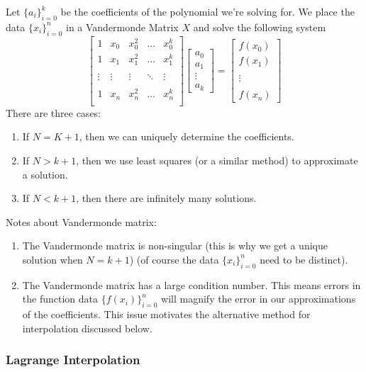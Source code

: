 \documentclass[12pt]{article}
\theoremstyle{definition}
\theoremstyle{definition}
\begin{document}
Let $\{a_i\}_{i=0}^k$ be the coefficients of the polynomial we're solving for. We place the data $\{x_i\}_{i=0}^n$ in a Vandermonde Matrix $X$ and solve the following system
\begin{equation}
	\begin{bmatrix}
	1 & x_0 & x_0^2 & \ldots & x_0^k \\
	1 & x_1 & x_1^2 & \ldots & x_1^k \\ \\
	\vdots & \vdots & \vdots & \ddots & \vdots \\ \\
	1 & x_n & x_n^2 & \ldots & x_n^k \\
	\end{bmatrix}
	\begin{bmatrix}
	a_0 \\ a_1 \\ \vdots \\ a_k
	\end{bmatrix}
	=
	\begin{bmatrix}
	f(x_0) \\ f(x_1) \\ \\ \vdots \\ \\ f(x_n)
	\end{bmatrix}
\end{equation}
There are three cases:
\begin{enumerate}
	\item If $N=K+1$, then we can uniquely determine the coefficients.
	\item If $N > k+1$, then we use least squares (or a similar method) to approximate a solution.
	\item If $N < k+1$, then there are infinitely many solutions. 
\end{enumerate}
Notes about Vandermonde matrix:
\begin{enumerate}
	\item The Vandermonde matrix is non-singular (this is why we get a unique solution when $N=k+1$) (of course the data $\{x_i\}_{i=0}^n$ need to be distinct).
	\item The Vandermonde matrix has a large condition number. This means errors in the function data $\{f(x_i)\}_{i=0}^n$ will magnify the error in our approximations of the coefficients. This issue motivates the alternative method for interpolation discussed below.
\end{enumerate}

\subsubsection{Lagrange Interpolation}
\end{document}
